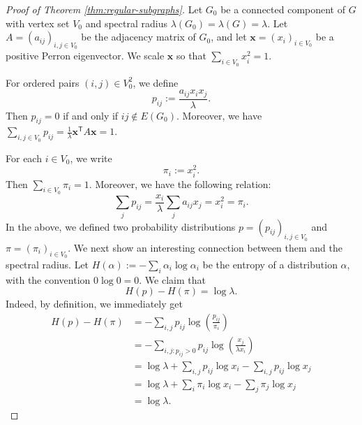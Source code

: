 \documentclass[11pt]{article}
\theoremstyle{definition}
\theoremstyle{plain}
\begin{document}
\begin{proof}[Proof of Theorem \ref{thm:regular-subgraphs}]
Let \(G_0\) be a connected component of \(G\) with vertex set \(V_0\)
and spectral radius \(\lambda(G_0)=\lambda (G)=\lambda \).  Let
\(A=(a_{ij})_{i,j\in V_0}\) be the adjacency matrix of \(G_0\), and let
\(\bm x=(x_i)_{i\in V_0}\) be a positive Perron eigenvector.  We scale
\(\bm x\) so that $\sum_{i\in V_0}x_i^2=1$. 

For ordered pairs \((i,j)\in V_0^2\), we define
\[
        p_{ij}:=\frac{a_{ij}x_i x_j}{\lambda}.
\]
Then \(p_{ij}=0\) if and only if \(ij\notin E(G_0)\).  Moreover, we have $ \sum_{i,j\in V_0}p_{ij}
        =
        \frac{1}{\lambda} \bm x^{\mathsf T}A\bm x
        =
        1$. 
        
For each \(i\in V_0\), we write 
\[ \pi_i:=x_i^2. \] 
Then $\sum_{i\in V_0} \pi_i =1$. Moreover, we have the following relation:  
\begin{equation} \label{eq:sum_j}
        \sum_j p_{ij}
        =
        \frac{x_i}{\lambda}\sum_j a_{ij}x_j
        =
        x_i^2 =\pi_i.
\end{equation}
In the above, we defined two probability distributions $p=(p_{ij})_{i,j\in V_0}$ and $\pi=(\pi_i)_{i\in V_0}$. 
We next show an interesting connection between them and the  spectral radius.
Let
$ H(\alpha):=-\sum_i \alpha_i\log\alpha_i$ 
be the entropy of a distribution $\alpha$, with the convention \(0\log0=0\). 
 We claim that 
\begin{equation} \label{eq-connection}
        H(p)-H(\pi)=\log\lambda .
\end{equation}
Indeed, by definition, we immediately get 
\[
\begin{aligned}
        H(p)-H(\pi)
        &=
        -\sum_{i,j}p_{ij}
        \log\left(\frac{p_{ij}}{\pi_i}\right)                              \\
        &=
        -\sum_{i,j:p_{ij}>0}p_{ij}
        \log\left(\frac{x_j}{\lambda x_i}\right)                            \\
        &=
        \log\lambda
        +
        \sum_{i,j}p_{ij}\log x_i
        -
        \sum_{i,j}p_{ij}\log x_j                                            \\
        &=
        \log\lambda
        +
        \sum_i \pi_i\log x_i
        -
        \sum_j \pi_j\log x_j                                                \\
        &=
        \log\lambda .
\end{aligned}
\]


\end{proof}
\end{document}
